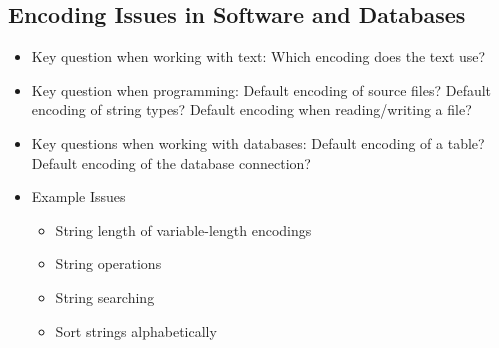 \documentclass[a4paper, 11pt, accentcolor = tud3b]{tudreport}
\begin{document}
            \subsection{Encoding Issues in Software and Databases} %
                \begin{itemize}
                	\item Key question when working with text: Which encoding does the text use?
                	\item Key question when programming: Default encoding of source files? Default encoding of string types? Default encoding when reading/writing a file?
                	\item Key questions when working with databases: Default encoding of a table? Default encoding of the database connection?
                	\item Example Issues
                		\begin{itemize}
                			\item String length of variable-length encodings
                			\item String operations
                			\item String searching
                			\item Sort strings alphabetically
                		\end{itemize}
                \end{itemize}
\end{document}
